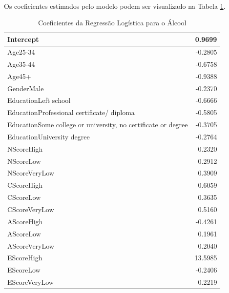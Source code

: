 \documentclass[
	article,			%
	11pt,				%
	oneside,			%
	a4paper,			%
	english,			%
	brazil,				%
	sumario=tradicional
	]{abntex2}
\begin{document}
Os coeficientes estimados pelo modelo podem ser visualizado na Tabela \ref{coef_reglog_alcohol}.

\begin{table}[H]
\centering
\begin{tabular}{|l|r|}
\hline
Intercept                                                     & 0.9699 \\ \hline

Age25-34                                                      & -0.2805 \\ \hline
Age35-44                                                      & -0.6758 \\ \hline
Age45+                                                        & -0.9388 \\ \hline
GenderMale                                                    & -0.2370  \\ \hline
EducationLeft school                                          & -0.6666 \\ \hline
EducationProfessional certificate/ diploma                    & -0.5805 \\ \hline
EducationSome college or university, no certificate or degree & -0.3705\\ \hline
EducationUniversity degree                                    & -0.2764  \\ \hline
NScoreHigh                                                    & 0.2320\\ \hline
NScoreLow                                                     & 0.2912  \\ \hline
NScoreVeryLow                                                 & 0.3909 \\ \hline
CScoreHigh                                                    & 0.6059 \\ \hline
CScoreLow                                                     & 0.3635  \\ \hline
CScoreVeryLow                                                 & 0.5160  \\ \hline

AScoreHigh                                                    & -0.4261 \\ \hline
AScoreLow                                                     & 0.1961  \\ \hline
AScoreVeryLow                                                 & 0.2040  \\ \hline

EScoreHigh                                                    & 13.5985  \\ \hline
EScoreLow                                                     & -0.2406 \\ \hline
EScoreVeryLow                                                 & -0.2219 \\ \hline
\end{tabular}
\caption{Coeficientes da Regressão Logística para o Álcool}
\label{coef_reglog_alcohol}
\end{table}
\end{document}
